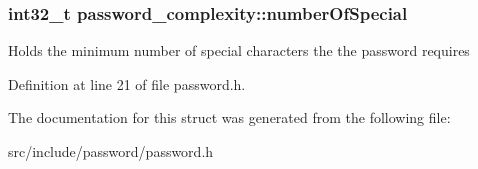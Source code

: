 \hypertarget{structpassword__complexity_afd0de21e4cb24b9cb21136ca295ae821}{}
\subsubsection[{number\+Of\+Special}]{\setlength{\rightskip}{0pt plus 5cm}int32\+\_\+t password\+\_\+complexity\+::number\+Of\+Special}\label{structpassword__complexity_afd0de21e4cb24b9cb21136ca295ae821}
Holds the minimum number of special characters the the password requires 

Definition at line 21 of file password.\+h.



The documentation for this struct was generated from the following file\+:\begin{DoxyCompactItemize}
\item 
src/include/password/password.\+h\end{DoxyCompactItemize}

